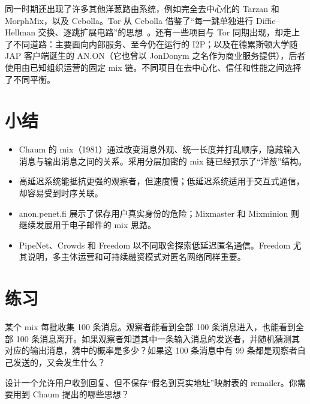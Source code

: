 \begin{approfondimento}[形形色色的“洋葱”]
同一时期还出现了许多其他洋葱路由系统，例如完全去中心化的 Tarzan 和 MorphMix，以及 Cebolla。Tor 从 Cebolla 借鉴了“每一跳单独进行 Diffie--Hellman 交换、逐跳扩展电路”的思想~\cite{syverson2011peel}。还有一些项目与 Tor 同期出现，却走上了不同道路：主要面向内部服务、至今仍在运行的 I2P；以及在德累斯顿大学随 JAP 客户端诞生的 AN.ON（它也曾以 JonDonym 之名作为商业服务提供），后者使用由已知组织运营的固定 mix 链。不同项目在去中心化、信任和性能之间选择了不同平衡。
\end{approfondimento}

\section*{小结}
\begin{itemize}
  \item Chaum 的 mix（1981）通过改变消息外观、统一长度并打乱顺序，隐藏输入消息与输出消息之间的关系。采用分层加密的 mix 链已经预示了“洋葱”结构。
  \item 高延迟系统能抵抗更强的观察者，但速度慢；低延迟系统适用于交互式通信，却容易受到时序关联。
  \item anon.penet.fi 展示了保存用户真实身份的危险；Mixmaster 和 Mixminion 则继续发展用于电子邮件的 mix 思路。
  \item PipeNet、Crowds 和 Freedom 以不同取舍探索低延迟匿名通信。Freedom 尤其说明，多主体运营和可持续融资模式对匿名网络同样重要。
\end{itemize}

\section*{练习}

\begin{esercizio}[1]\label{es:02-mix}
某个 mix 每批收集 100 条消息。观察者能看到全部 100 条消息进入，也能看到全部 100 条消息离开。如果观察者知道其中一条输入消息的发送者，并随机猜测其对应的输出消息，猜中的概率是多少？如果这 100 条消息中有 99 条都是观察者自己发送的，又会发生什么？
\end{esercizio}

\begin{esercizio}[2]\label{es:02-penet}
设计一个允许用户收到回复、但不保存“假名到真实地址”映射表的 remailer。你需要用到 Chaum 提出的哪些思想？
\end{esercizio}

